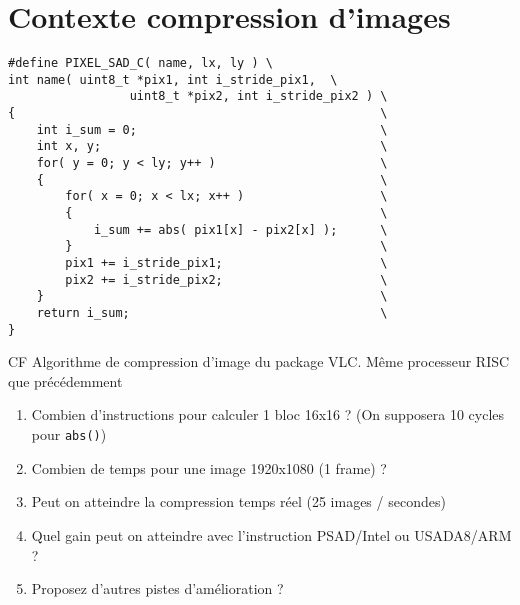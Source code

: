\documentclass{article}
\begin{document}
\section{Contexte compression d'images}
\begin{verbatim}
#define PIXEL_SAD_C( name, lx, ly ) \
int name( uint8_t *pix1, int i_stride_pix1,  \
                 uint8_t *pix2, int i_stride_pix2 ) \
{                                                   \
    int i_sum = 0;                                  \
    int x, y;                                       \
    for( y = 0; y < ly; y++ )                       \
    {                                               \
        for( x = 0; x < lx; x++ )                   \
        {                                           \
            i_sum += abs( pix1[x] - pix2[x] );      \
        }                                           \
        pix1 += i_stride_pix1;                      \
        pix2 += i_stride_pix2;                      \
    }                                               \
    return i_sum;                                   \
}
\end{verbatim}
CF Algorithme de compression d'image du package VLC. Même processeur
RISC que précédemment
\begin{enumerate}
\item Combien d'instructions pour calculer 1 bloc 16x16 ? (On
  supposera 10 cycles pour \texttt{abs()})
\item Combien de temps pour une image 1920x1080 (1 frame) ? 
\item Peut on atteindre la compression temps réel (25 images /
  secondes)
\item Quel gain peut on atteindre avec l'instruction PSAD/Intel ou
  USADA8/ARM ?
\item Proposez d'autres pistes d'amélioration ?
\end{enumerate}



\end{document}
